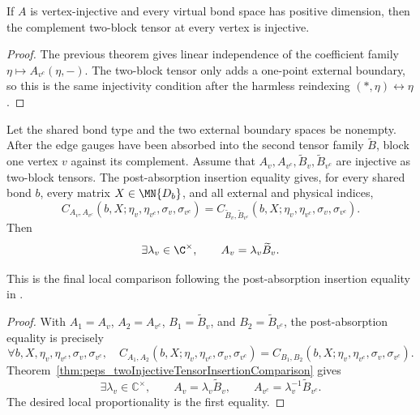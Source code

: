 \begin{theorem}%
    \label{thm:peps_isTwoBlockInjective_complementTwoBlock}
    \leanok
    If $A$ is vertex-injective and every virtual bond space has positive
    dimension, then the complement two-block tensor at every vertex is
    injective.
\end{theorem}
\begin{proof}\leanok
    The previous theorem gives linear independence of the coefficient family
    $\eta\mapsto A_{v^c}(\eta,-)$. The two-block tensor only adds a one-point
    external boundary, so this is the same injectivity condition after the
    harmless reindexing $(*,\eta)\leftrightarrow\eta$.
\end{proof}

\begin{theorem}%
    \label{thm:peps_oneVertexComplementComparison}
    \leanok
    Let the shared bond type and the two external boundary spaces be nonempty.
    After the edge gauges have been absorbed into the second tensor family
    $\widetilde B$, block one vertex $v$ against its complement. Assume that
    $A_v,A_{v^c},\widetilde B_v,\widetilde B_{v^c}$ are injective as two-block
    tensors. The post-absorption insertion equality gives, for every shared
    bond $b$, every matrix $X\in\MN{D_b}$, and all external and
    physical indices,
    \[
        C_{A_v,A_{v^c}}(b,X;\eta_v,\eta_{v^c},\sigma_v,\sigma_{v^c})
        =
        C_{\widetilde B_v,\widetilde B_{v^c}}
        (b,X;\eta_v,\eta_{v^c},\sigma_v,\sigma_{v^c}).
    \]
    Then
    \[
        \exists\lambda_v\in\C^\times,\qquad
        A_v=\lambda_v\widetilde B_v.
    \]
    \begin{center}
        \TNPEPSOneVertexComplementComparison
    \end{center}
    This is the final local comparison following the post-absorption insertion
    equality in \cite[Section~3]{Molnar2018NormalPEPS}.
\end{theorem}
\begin{proof}\leanok
    With $A_1=A_v$, $A_2=A_{v^c}$, $B_1=\widetilde B_v$, and
    $B_2=\widetilde B_{v^c}$, the post-absorption equality is precisely
    \[
        \forall b,X,\eta_v,\eta_{v^c},\sigma_v,\sigma_{v^c},\quad
        C_{A_1,A_2}(b,X;\eta_v,\eta_{v^c},\sigma_v,\sigma_{v^c})
        =
        C_{B_1,B_2}(b,X;\eta_v,\eta_{v^c},\sigma_v,\sigma_{v^c}).
    \]
    Theorem~\ref{thm:peps_twoInjectiveTensorInsertionComparison} gives
    \[
        \exists\lambda_v\in\mathbb C^\times,\qquad
        A_v=\lambda_v\widetilde B_v,\qquad
        A_{v^c}=\lambda_v^{-1}\widetilde B_{v^c}.
    \]
    The desired local proportionality is the first equality.
\end{proof}

